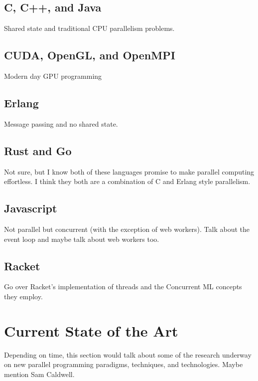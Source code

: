 \documentclass{article}
\begin{document}
\subsection{C, C++, and Java}
Shared state and traditional CPU parallelism problems.

\subsection{CUDA, OpenGL, and OpenMPI}
Modern day GPU programming

\subsection{Erlang}
Message passing and no shared state.

\subsection{Rust and Go}
Not sure, but I know both of these languages promise to make parallel computing
effortless. I think they both are a combination of C and Erlang style parallelism.

\subsection{Javascript}
Not parallel but concurrent (with the exception of web workers). Talk about
the event loop and maybe talk about web workers too.

\subsection{Racket}
Go over Racket's implementation of threads and the Concurrent ML concepts they employ.

\section{Current State of the Art}
Depending on time, this section would talk about some of the research underway on
new parallel programming paradigms, techniques, and technologies. Maybe mention
Sam Caldwell.
\end{document}

